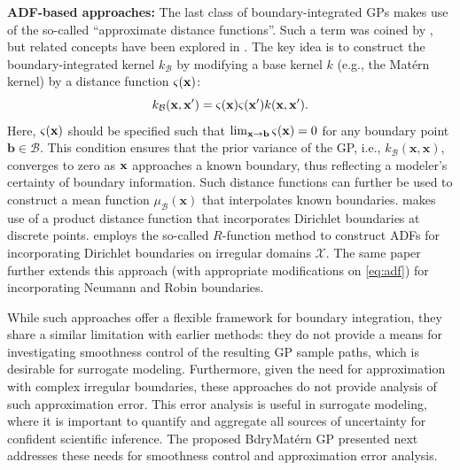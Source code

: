 \documentclass[aos,preprint]{imsart}
\theoremstyle{plain}
\newcommand{\Bx}{\bold x}
\theoremstyle{remark}
\begin{document}

\textbf{ADF-based approaches:} The last class of boundary-integrated GPs makes use of the so-called ``approximate distance functions''. Such a term was coined by \cite{dalton2024boundary}, but related concepts have been explored in \cite{tan2018gaussian,li2022improving}. The key idea is to construct the boundary-integrated kernel $k_{\mathcal{B}}$ by modifying a base kernel $k$ (e.g., the Mat\'ern kernel) by a distance function $\varsigma(\Bx)$:
\begin{equation}
k_{\mathcal{B}}(\mathbf{x},\mathbf{x}') = \varsigma(\Bx) \varsigma(\Bx') k(\mathbf{x},\mathbf{x}').
\label{eq:adf}
\end{equation}
Here, $\varsigma(\Bx)$ should be specified such that $\lim_{\Bx \rightarrow \mathbf{b}} \varsigma(\Bx) = 0$ for any boundary point $\mathbf{b} \in \mathcal{B}$. This condition ensures that the prior variance of the GP, i.e., $k_{\mathcal{B}}(\mathbf{x},\mathbf{x})$, converges to zero as $\Bx$ approaches a known boundary, thus reflecting a modeler's certainty of boundary information. Such distance functions can further be used to construct a mean function $\mu_{\mathcal{B}}(\mathbf{x})$ that interpolates known boundaries. \cite{tan2018gaussian} makes use of a product distance function that incorporates Dirichlet boundaries at discrete points. \cite{dalton2024boundary} employs the so-called $R$-function method \citep{rvachev1995r} to construct ADFs for incorporating Dirichlet boundaries on irregular domains $\mathcal{X}$. The same paper further extends this approach (with appropriate modifications on \eqref{eq:adf}) for incorporating Neumann and Robin boundaries.

While such approaches offer a flexible framework for boundary integration, they share a similar limitation with earlier methods: they do not provide a means for investigating smoothness control of the resulting GP sample paths, which is desirable for surrogate modeling. Furthermore, given the need for approximation with complex irregular boundaries, these approaches do not provide analysis of such approximation error. This error analysis is useful in surrogate modeling, where it is important to quantify and aggregate all sources of uncertainty for confident scientific inference. The proposed BdryMat\'ern GP presented next addresses these needs for smoothness control and approximation error analysis.
\end{document}
